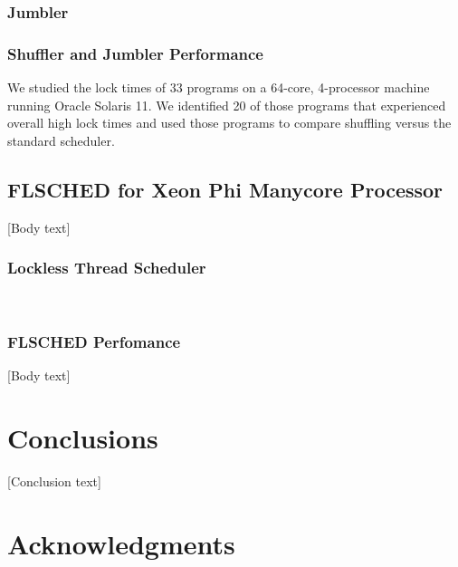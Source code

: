 \documentclass{sig-alternate}
\begin{document}
\subsubsection{Jumbler}
\label{sec:jumbler}



\subsubsection{Shuffler and Jumbler Performance}
\label{sec:sj_performance}

We studied the lock times of 33 programs on a 64-core, 4-processor machine running Oracle Solaris 11. We identified 20 of those programs that experienced overall high lock times and used those programs to compare shuffling versus the standard scheduler.~\cite{KumarEtal:2014}



\subsection{FLSCHED for Xeon Phi Manycore Processor}
\label{sec:flsched}

[Body text]

\subsubsection{Lockless Thread Scheduler}
\label{sec:flsched_about}

\cite{Lozi:2016, NisarEtal:2017}
~\cite{KumarEtal:2014}

\subsubsection{FLSCHED Perfomance}
\label{sec:flsched_performance}

[Body text]

\section{Conclusions}
\label{sec:conclusions}

[Conclusion text]

\section*{Acknowledgments}
\label{sec:acknowledgments}



  
\end{document}
